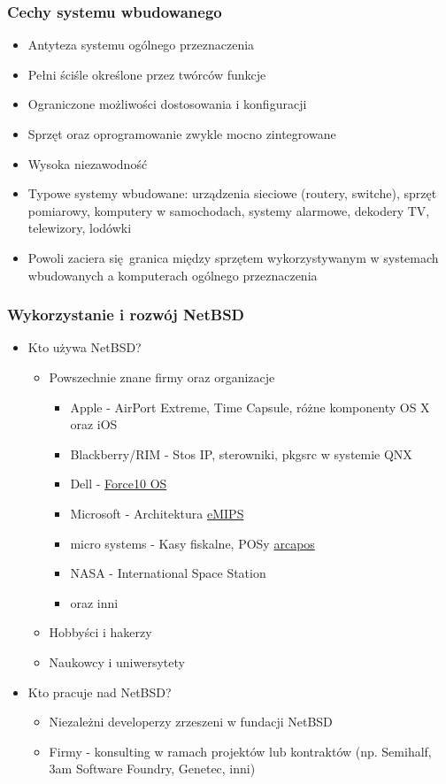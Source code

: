 \documentclass[dvipsnames,table]{beamer}
\begin{document}
\begin{frame}
\frametitle{Cechy systemu wbudowanego}
\begin{itemize}
	\item Antyteza systemu ogólnego przeznaczenia
	\item Pełni ściśle określone przez twórców funkcje
	\item Ograniczone możliwości dostosowania i konfiguracji
	\item Sprzęt oraz oprogramowanie zwykle mocno zintegrowane
	\item Wysoka niezawodność
	\item Typowe systemy wbudowane: urządzenia sieciowe (routery, switche), sprzęt pomiarowy, komputery w samochodach, systemy alarmowe, dekodery TV, telewizory, lodówki
	\item Powoli zaciera się granica między sprzętem wykorzystywanym w systemach wbudowanych a komputerach ogólnego przeznaczenia
\end{itemize}
\end{frame}

\begin{frame}
\frametitle{Wykorzystanie i rozwój NetBSD}
\begin{itemize}
\item Kto używa NetBSD?
\begin{itemize}
	\item Powszechnie znane firmy oraz organizacje
	\begin{itemize}
		\item Apple - AirPort Extreme, Time Capsule, różne komponenty OS X oraz iOS
		\item Blackberry/RIM - Stos IP, sterowniki, pkgsrc w systemie QNX
		\item Dell - \href{http://www.dell.com/us/business/p/force10-ftos/pd}{Force10 OS}
 		\item Microsoft - Architektura \href{http://research.microsoft.com/en-us/projects/emips/}{eMIPS}
		\item micro systems - Kasy fiskalne, POSy \href{http://www.arcapos.ch/produkt/}{arcapos}
		\item NASA - International Space Station
		\item oraz inni
	\end{itemize}
	\item Hobbyści i hakerzy
	\item Naukowcy i uniwersytety
\end{itemize}
\item{Kto pracuje nad NetBSD?}
\begin{itemize}
	\item Niezależni developerzy zrzeszeni w fundacji NetBSD
	\item Firmy - konsulting w ramach projektów lub kontraktów (np. Semihalf, 3am Software Foundry, Genetec, inni)
\end{itemize}

\end{itemize}
\end{frame}
\end{document}
